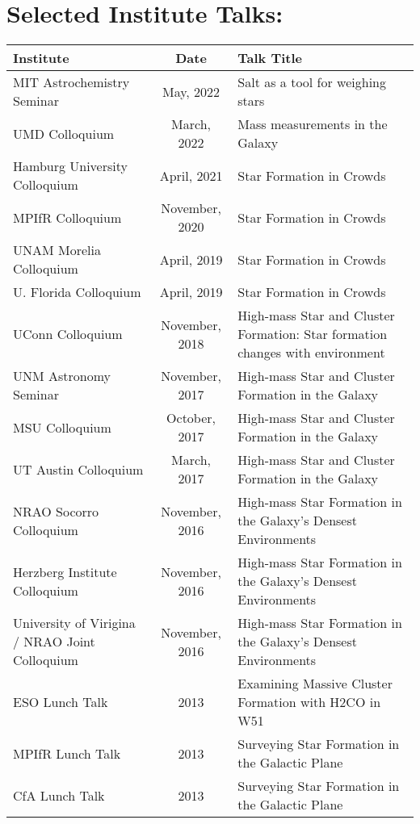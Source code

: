 
\begin{minipage}{\textwidth}
\setlength{\extrarowheight}{4pt}
\section*{Selected Institute Talks:}
\vspace{-12pt}
\begin{tabular}{p{1.8in}cp{3.5in}}
    Institute & Date & Talk Title \\
                \hline
    MIT Astrochemistry Seminar & May, 2022 & Salt as a tool for weighing stars \\
    UMD Colloquium & March, 2022 & Mass measurements in the Galaxy \\
    Hamburg University Colloquium & April, 2021 & Star Formation in Crowds \\
    MPIfR Colloquium & November, 2020 & Star Formation in Crowds \\
    UNAM Morelia Colloquium & April, 2019 & Star Formation in Crowds \\
    U. Florida Colloquium & April, 2019 & Star Formation in Crowds \\
    UConn Colloquium & November, 2018 & High-mass Star and Cluster Formation: Star formation changes with environment \\
    UNM Astronomy Seminar & November, 2017 & High-mass Star and Cluster Formation in the Galaxy \\
    MSU Colloquium & October, 2017 & High-mass Star and Cluster Formation in the Galaxy \\
    UT Austin Colloquium & March, 2017 & High-mass Star and Cluster Formation in the Galaxy \\
    NRAO Socorro Colloquium & November, 2016 & High-mass Star Formation in the Galaxy's Densest Environments \\
    Herzberg Institute Colloquium & November, 2016 & High-mass Star Formation in the Galaxy's Densest Environments \\
    University of Virigina / NRAO Joint Colloquium & November, 2016 & High-mass Star Formation in the Galaxy's Densest Environments \\
    ESO Lunch Talk & 2013 & Examining Massive Cluster Formation with H2CO in W51 \\
    MPIfR Lunch Talk & 2013 & Surveying Star Formation in the Galactic Plane  \\
    CfA Lunch Talk & 2013 & Surveying Star Formation in the Galactic Plane  \\
\end{tabular}
\end{minipage}
\vspace{4mm}
